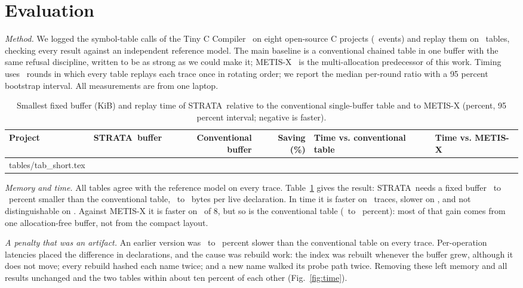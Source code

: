 \documentclass[conference,10pt]{IEEEtran}
\makeatletter
\newcommand{\tabinput}[1]{\@@input #1.tex }
\newcommand{\st}{STRATA}
\makeatother
\begin{document}
\section{Evaluation}
\emph{Method.} We logged the symbol-table calls of the Tiny C Compiler~\cite{tcc} on eight open-source C projects (\TotalEvents\ events) and replay them on \NTables\ tables, checking every result against an independent reference model. The main baseline is a conventional chained table in one buffer with the same refusal discipline, written to be as strong as we could make it; METIS-X~\cite{metis} is the multi-allocation predecessor of this work. Timing uses \Rounds\ rounds in which every table replays each trace once in rotating order; we report the median per-round ratio with a 95 percent bootstrap interval. All measurements are from one laptop.

\begin{table}[t!]
\caption{Smallest fixed buffer (KiB) and replay time of \st\ relative to the conventional single-buffer table and to METIS-X (percent, 95 percent interval; negative is faster).}
\label{tab:short}
\centering
\setlength{\tabcolsep}{6pt}
\begin{tabular}{|l|r|r|r|l|l|}
\hline
Project & \st\ buffer & Conventional buffer & Saving (\%) & Time vs. conventional table & Time vs. METIS-X \\
\hline
\tabinput{tables/tab_short}
\end{tabular}
\end{table}

\emph{Memory and time.} All tables agree with the reference model on every trace. Table~\ref{tab:short} gives the result: \st\ needs a fixed buffer \SaveLo\ to \SaveHi\ percent smaller than the conventional table, \BytesLo\ to \BytesHi\ bytes per live declaration. In time it is faster on \ArenaFaster\ traces, slower on \ArenaSlower, and not distinguishable on \ArenaNE. Against METIS-X it is faster on \MetisFaster\ of 8, but so is the conventional table (\AMLo\ to \AMHi\ percent): most of that gain comes from one allocation-free buffer, not from the compact layout.

\emph{A penalty that was an artifact.} An earlier version was \BeforeLo\ to \BeforeHi\ percent slower than the conventional table on every trace. Per-operation latencies placed the difference in declarations, and the cause was rebuild work: the index was rebuilt whenever the buffer grew, although it does not move; every rebuild hashed each name twice; and a new name walked its probe path twice. Removing these left memory and all results unchanged and the two tables within about ten percent of each other (Fig.~\ref{fig:time}).
\end{document}
